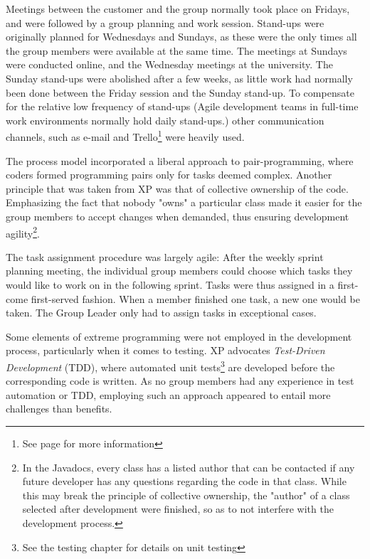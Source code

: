 Meetings between the customer and the group normally took place on Fridays, and were followed by a group planning and work session. Stand-ups were originally planned for Wednesdays and Sundays, as these were the only times all the group members were available at the same time. The meetings at Sundays were conducted online, and the Wednesday meetings at the university. The Sunday stand-ups were abolished after a few weeks, as little work had normally been done between the Friday session and the Sunday stand-up. To compensate for the relative low frequency of stand-ups (Agile development teams in full-time work environments normally hold daily stand-ups.) other communication channels, such as e-mail and Trello\footnote{See page \pageref{def:trello} for more information} were heavily used.

The process model incorporated a liberal approach to pair-programming, where coders formed programming pairs only for tasks deemed complex. Another principle that was taken from XP was that of collective ownership of the code. Emphasizing the fact that nobody "owns" a particular class made it easier for the group members to accept changes when demanded, thus ensuring development agility\footnote{In the Javadocs, every class has a listed author that can be contacted if any future developer has any questions regarding the code in that class. While this may break the principle of collective ownership, the "author" of a class selected after development were finished, so as to not interfere with the development process.}.

The task assignment procedure was largely agile: After the weekly sprint planning meeting, the individual group members could choose which tasks they would like to work on in the following sprint. Tasks were thus assigned in a first-come first-served fashion. When a member finished one task, a new one would be taken. The Group Leader only had to assign tasks in exceptional cases.

Some elements of extreme programming were not employed in the development process, particularly when it comes to testing. XP advocates \emph{Test-Driven Development} (TDD), where automated unit tests\footnote{See the testing chapter for details on unit testing} are developed before the corresponding code is written. As no group members had any experience in test automation or TDD, employing such an approach appeared to entail more challenges than benefits. 

